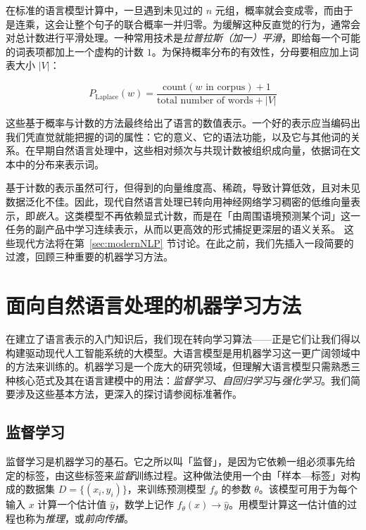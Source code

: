 在标准的语言模型计算中，一旦遇到未见过的 $n$ 元组，概率就会变成零，而由于是连乘，这会让整个句子的联合概率一并归零。为缓解这种反直觉的行为，通常会对总计数进行平滑处理。一种常用技术是\emph{拉普拉斯（加一）平滑}，即给每一个可能的词表项都加上一个虚构的计数 $1$。为保持概率分布的有效性，分母要相应加上词表大小 $|V|$：

\begin{equation}
\label{eq:mle-word-prob-laplace}
    P_{\text{Laplace}}(w) = \frac{\text{count}(w \text{ in corpus}) + 1}{\text{total number of words} + |V|}
\end{equation}

这些基于概率与计数的方法最终给出了语言的数值表示。一个好的表示应当编码出我们凭直觉就能把握的词的属性：它的意义、它的语法功能，以及它与其他词的关系。在早期自然语言处理中，这些相对频次与共现计数被组织成向量，依据词在文本中的分布来表示词。

基于计数的表示虽然可行，但得到的向量维度高、稀疏，导致计算低效，且对未见数据泛化不佳。因此，现代自然语言处理已转向用神经网络学习稠密的低维向量表示，即\emph{嵌入}。这类模型不再依赖显式计数，而是在「由周围语境预测某个词」这一任务的副产品中学习连续表示，从而以更高效的形式捕捉更深层的语义关系。
这些现代方法将在第~\ref{sec:modernNLP} 节讨论。在此之前，我们先插入一段简要的过渡，回顾三种重要的机器学习方法。

\section{面向自然语言处理的机器学习方法}
\label{sec:machinelearning}
在建立了语言表示的入门知识后，我们现在转向学习算法——正是它们让我们得以构建驱动现代人工智能系统的大模型。大语言模型是用机器学习这一更广阔领域中的方法来训练的。机器学习是一个庞大的研究领域，但理解大语言模型只需熟悉三种核心范式及其在语言建模中的用法：\emph{监督学习}、\emph{自回归学习}与\emph{强化学习}。我们简要涉及这些基本方法，更深入的探讨请参阅标准著作。

\subsection{监督学习} 
监督学习是机器学习的基石。它之所以叫「监督」，是因为它依赖一组必须事先给定的标签，由这些标签来\textit{监督}训练过程。这种做法使用一个由「样本—标签」对构成的数据集 $D = \{(x_i, y_i)\}$，来训练预测模型 $f_\theta$ 的参数 $\theta$。该模型可用于为每个输入 $x$ 计算一个估计值 $\hat{y}$，数学上记作 $f_\theta(x) \rightarrow \hat{y}$。用模型计算这一估计值的过程也称为{\em 推理}，或{\em 前向传播}。


